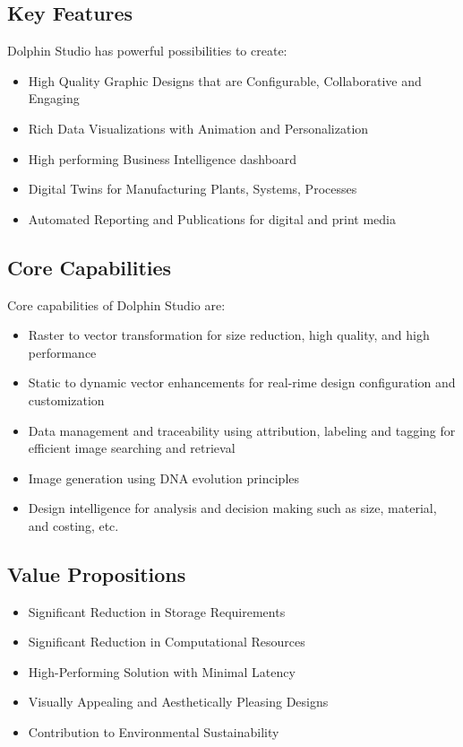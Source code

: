 \documentclass{amm-pst-report}
\begin{document}
\subsection{Key Features}
Dolphin Studio has powerful possibilities to create:
\begin{itemize}[nosep]
\item High Quality Graphic Designs that are Configurable, Collaborative and Engaging
\item Rich Data Visualizations with Animation and Personalization
\item High performing Business Intelligence dashboard
\item Digital Twins for Manufacturing Plants, Systems, Processes
\item Automated Reporting and Publications for digital and print media
\end{itemize}


\subsection{Core Capabilities}
Core capabilities of Dolphin Studio are:
\begin{itemize}[nosep]
\item Raster to vector transformation for size reduction, high quality, and high performance
\item Static to dynamic vector enhancements for real-rime design configuration and customization
\item Data management and traceability using attribution, labeling and tagging for efficient image searching and retrieval
\item Image generation using DNA evolution principles
\item Design intelligence for analysis and decision making such as size, material, and costing, etc.
\end{itemize}

\subsection{Value Propositions}
\begin{itemize}
\item Significant Reduction in Storage Requirements
\item Significant Reduction in Computational Resources
\item High-Performing Solution with Minimal Latency
\item Visually Appealing and Aesthetically Pleasing Designs
\item Contribution to Environmental Sustainability
\end{itemize}
\end{document}
